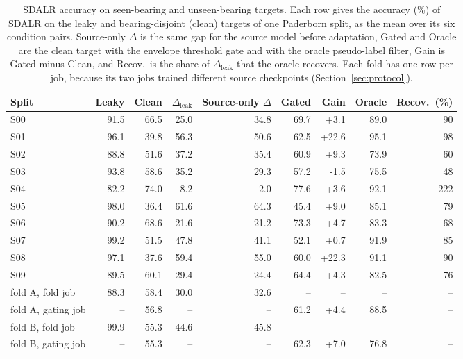 \begin{table}[htbp]
\centering
\begingroup
\small
\setlength{\tabcolsep}{4pt}
\begin{tabular}{lrrrrrrrr}
\toprule
Split & Leaky & Clean & $\Delta_{\mathrm{leak}}$ & Source-only $\Delta$ & Gated & Gain & Oracle & Recov.\ (\%) \\
\midrule
S00 & 91.5 & 66.5 & 25.0 & 34.8 & 69.7 & +3.1 & 89.0 & 90 \\
S01 & 96.1 & 39.8 & 56.3 & 50.6 & 62.5 & +22.6 & 95.1 & 98 \\
S02 & 88.8 & 51.6 & 37.2 & 35.4 & 60.9 & +9.3 & 73.9 & 60 \\
S03 & 93.8 & 58.6 & 35.2 & 29.3 & 57.2 & -1.5 & 75.5 & 48 \\
S04 & 82.2 & 74.0 & 8.2 & 2.0 & 77.6 & +3.6 & 92.1 & 222 \\
S05 & 98.0 & 36.4 & 61.6 & 64.3 & 45.4 & +9.0 & 85.1 & 79 \\
S06 & 90.2 & 68.6 & 21.6 & 21.2 & 73.3 & +4.7 & 83.3 & 68 \\
S07 & 99.2 & 51.5 & 47.8 & 41.1 & 52.1 & +0.7 & 91.9 & 85 \\
S08 & 97.1 & 37.6 & 59.4 & 55.0 & 60.0 & +22.3 & 91.1 & 90 \\
S09 & 89.5 & 60.1 & 29.4 & 24.4 & 64.4 & +4.3 & 82.5 & 76 \\
\midrule
fold A, fold job & 88.3 & 58.4 & 30.0 & 32.6 & -- & -- & -- & -- \\
fold A, gating job & -- & 56.8 & -- & -- & 61.2 & +4.4 & 88.5 & -- \\
fold B, fold job & 99.9 & 55.3 & 44.6 & 45.8 & -- & -- & -- & -- \\
fold B, gating job & -- & 55.3 & -- & -- & 62.3 & +7.0 & 76.8 & -- \\
\bottomrule
\end{tabular}\par
\endgroup
\caption{SDALR accuracy on seen-bearing and unseen-bearing targets. Each row gives the accuracy (\%) of SDALR on the leaky and bearing-disjoint (clean) targets of one Paderborn split, as the mean over its six condition pairs. Source-only $\Delta$ is the same gap for the source model before adaptation, Gated and Oracle are the clean target with the envelope threshold gate and with the oracle pseudo-label filter, Gain is Gated minus Clean, and Recov.\ is the share of $\Delta_{\mathrm{leak}}$ that the oracle recovers. Each fold has one row per job, because its two jobs trained different source checkpoints (Section~\ref{sec:protocol}).}
\label{tab:collapse}
\end{table}
